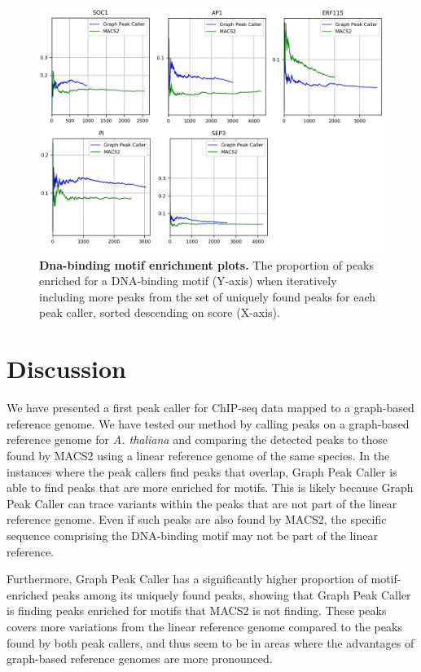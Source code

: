 \documentclass[10pt,letterpaper]{article}
\begin{document}
\begin{figure}[!h]
 \includegraphics[width=1.0\textwidth]{figures/Fig4.png}
 \caption{{\bf Dna-binding motif enrichment plots.} The proportion of peaks enriched for a DNA-binding motif (Y-axis) when iteratively including more peaks from the set of uniquely found peaks for each peak caller, sorted descending on score (X-axis). }
\label{motif_plots}
\end{figure}



\section*{Discussion}
We have presented a first peak caller for ChIP-seq data mapped to a graph-based reference genome. We have tested our method by calling peaks on a graph-based reference genome for \emph{A. thaliana} and comparing the detected peaks to those found by MACS2 using a linear reference genome of the same species. In the instances where the peak callers find peaks that overlap, Graph Peak Caller is able to find peaks that are more enriched for motifs. This is likely because Graph Peak Caller can trace variants within the peaks that are not part of the linear reference genome. Even if such peaks are also found by MACS2, the specific sequence comprising the DNA-binding motif may not be part of the linear reference.
	
Furthermore, Graph Peak Caller has a significantly higher proportion of motif-enriched peaks among its uniquely found peaks, showing that Graph Peak Caller is finding peaks enriched for motifs that MACS2 is not finding.
These peaks covers more variations from the linear reference genome compared to the peaks found by both peak callers, and thus seem to be in areas where the advantages of graph-based reference genomes are more pronounced. 
\end{document}
